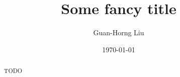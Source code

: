 \documentclass[hidelinks, 12pt]{cmuthesis}
\begin{document}
 
\frontmatter

\pagestyle{empty}

\title{ %
{\bf Some fancy title}}
\author{Guan-Horng Liu}
\date{\today}
\trnumber{}


\support{}
\disclaimer{}



\maketitle



\pagestyle{plain} %


\begin{abstract}



  TODO
\end{abstract}
\end{document}
